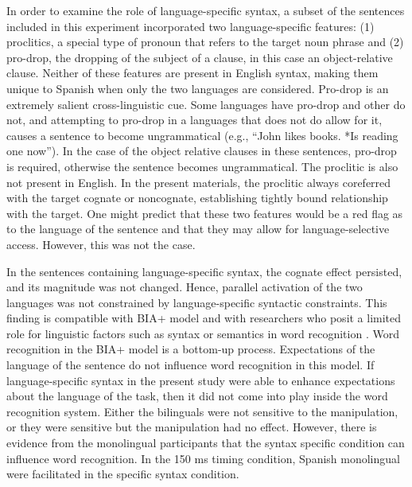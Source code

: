 In order to examine the role of language-specific syntax, a subset of the sentences included in this experiment incorporated two language-specific features: (1) proclitics, a special type of pronoun that refers to the target noun phrase and (2) pro-drop, the dropping of the subject of a clause, in this case an object-relative clause. Neither of these features are present in English syntax, making them unique to Spanish when only the two languages are considered. Pro-drop is an extremely salient cross-linguistic cue. Some languages have pro-drop and other do not, and attempting to pro-drop in a languages that does not do allow for it, causes   a sentence to become ungrammatical (e.g., ``John likes books. *Is reading one now''). In the case of the object relative clauses in these sentences, pro-drop is required, otherwise the sentence becomes ungrammatical. The proclitic is also not present in English. In the present materials, the proclitic always coreferred with the target cognate or noncognate, establishing tightly bound relationship with the target. One might predict that these two features would be a red flag as to the language of the sentence and that they may allow for language-selective access. However, this was not the case.

In the sentences containing language-specific syntax, the cognate effect persisted, and its magnitude was not changed. Hence, parallel activation of the two languages was not constrained by language-specific syntactic constraints. This finding is compatible with BIA+ model \parencite[][]{Dijkstra2002} and with researchers who posit a limited role for linguistic factors such as syntax or semantics in word recognition \parencite[e.g.,][]{Desmet2007}. Word recognition in the BIA+ model is a bottom-up process. Expectations of the language of the sentence  do not influence word recognition in this model. If language-specific syntax in the present study were able to enhance  expectations about the language of the task, then it did not come into play inside the word recognition system. Either the bilinguals were not sensitive to the manipulation, or they were sensitive but the manipulation had no effect. However, there is evidence from the monolingual participants that the syntax specific condition can influence word recognition. In the 150 ms timing condition, Spanish monolingual were facilitated in the specific syntax condition.  


